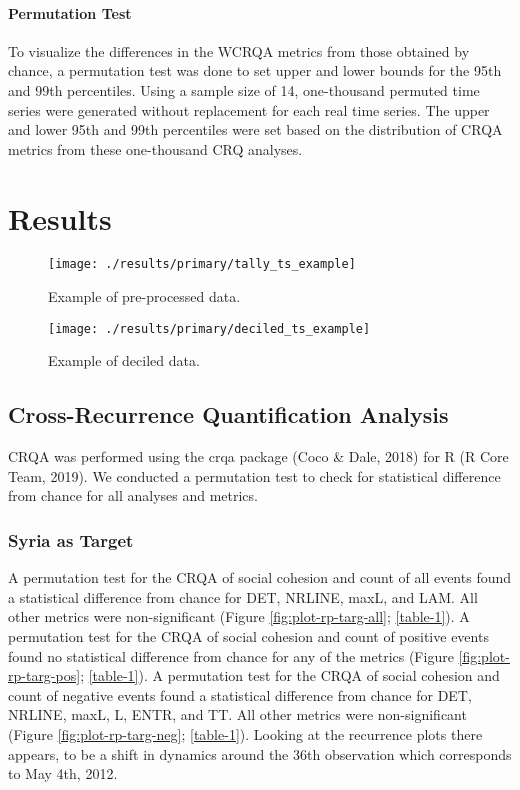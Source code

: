 \documentclass[english,man]{apa6}
\begin{document}
\hypertarget{permutation-test-1}{%
\paragraph{Permutation Test}\label{permutation-test-1}}

To visualize the differences in the WCRQA metrics from those obtained by chance, a permutation test was done to set upper and lower bounds for the 95th and 99th percentiles. Using a sample size of 14, one-thousand permuted time series were generated without replacement for each real time series. The upper and lower 95th and 99th percentiles were set based on the distribution of CRQA metrics from these one-thousand CRQ analyses.

\hypertarget{results}{%
\section{Results}\label{results}}

\begin{figure}
\texttt{[image: ./results/primary/tally\_ts\_example]} \caption{Example of pre-processed data.}\label{fig:raw-ts}
\end{figure}

\begin{figure}
\texttt{[image: ./results/primary/deciled\_ts\_example]} \caption{Example of deciled data.}\label{fig:deciled-ts}
\end{figure}

\hypertarget{cross-recurrence-quantification-analysis-1}{%
\subsection{Cross-Recurrence Quantification Analysis}\label{cross-recurrence-quantification-analysis-1}}

CRQA was performed using the crqa package (Coco \& Dale, 2018) for R (R Core Team, 2019). We conducted a permutation test to check for statistical difference from chance for all analyses and metrics.

\hypertarget{syria-as-target}{%
\subsubsection{Syria as Target}\label{syria-as-target}}

A permutation test for the CRQA of social cohesion and count of all events found a statistical difference from chance for DET, NRLINE, maxL, and LAM. All other metrics were non-significant (Figure \ref{fig:plot-rp-targ-all}; \autoref{table-1}). A permutation test for the CRQA of social cohesion and count of positive events found no statistical difference from chance for any of the metrics (Figure \ref{fig:plot-rp-targ-pos}; \autoref{table-1}). A permutation test for the CRQA of social cohesion and count of negative events found a statistical difference from chance for DET, NRLINE, maxL, L, ENTR, and TT. All other metrics were non-significant (Figure \ref{fig:plot-rp-targ-neg}; \autoref{table-1}). Looking at the recurrence plots there appears, to be a shift in dynamics around the 36th observation which corresponds to May 4th, 2012.
\end{document}
